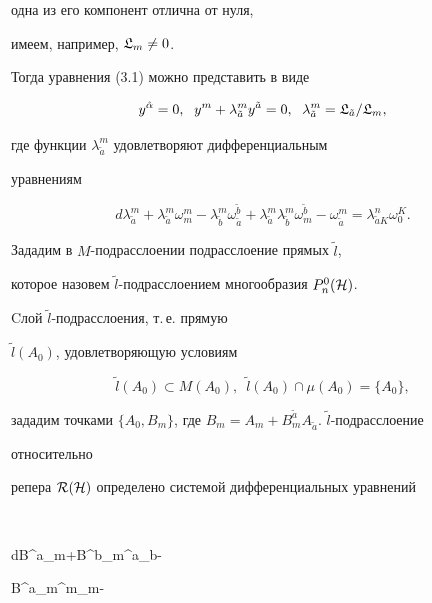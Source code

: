 одна из его компонент отлична от нуля,


имеем, например, $\frak L_{m}\ne 0$.


Тогда уравнения (3.1) можно представить в виде


$$


y^{\hat \alpha}=0,\ \; y^{m}+\lambda^{m}_{\tilde a}


y^{\tilde a} = 0,\ \;


\lambda^{m}_{\tilde a}=


\frak L_{\tilde a}/\frak L_{m},


$$


где функции $\lambda^{m}_{\tilde a}$ удовлетворяют дифференциальным


уравнениям


$$


d\lambda^m_{\tilde a}+\lambda^m_{\tilde a}\omega^m_m-


\lambda^m_{\tilde b}\omega^{\tilde b}_{\tilde a}+


\lambda^m_{\tilde a}\lambda^m_{\tilde b}\omega^{\tilde b}_m-


\omega^m_{\tilde a}=


\lambda^n_{\tilde a K} \omega^K_0.


$$





Зададим в $M$-подрасслоении подрасслоение прямых $\widetilde l$,


которое назовем $\widetilde l$-подрасслоением многообразия $P^0_n(\cal H)$.


Cлой $\widetilde l$-подрасслоения, т.\,е. прямую


$\widetilde l(A_0)$, удовлетворяющую условиям


$$


\widetilde l(A_0)\subset M(A_0),\ \;


\widetilde l(A_0)\cap \mu (A_0) = \{ A_0 \},


$$


зададим точками $\{ A_0, B_m\}$, где $B_m = A_m +


B^{\widetilde a}_m A_{\widetilde a}$.\; $\widetilde l$-подрасслоение


относительно


репера $\cal R(\cal H)$ определено системой дифференциальных уравнений


$$


dB^{\tilde a}_m+B^{\tilde b}_m\omega^{\tilde a}_{\tilde b}-


B^{\tilde a}_m\omega^m_m-



